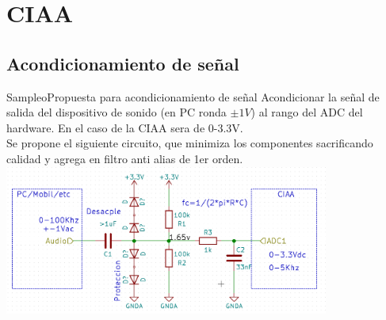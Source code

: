  \section{CIAA}
 \subsection{Acondicionamiento de señal}
 \begin{frame}{Sampleo}{Propuesta para acondicionamiento de señal}
    Acondicionar la señal de salida del dispositivo de sonido (en PC ronda $\pm1V$) al rango del ADC del hardware. En el caso de la CIAA sera de 0-3.3V. \\ Se propone el siguiente circuito, que minimiza los componentes sacrificando calidad y agrega en filtro anti alias de 1er orden.
    \protoboardicon
    \center\includegraphics[width=0.8\textwidth]{1_clase/circuito}
    \vfill
 \end{frame}

